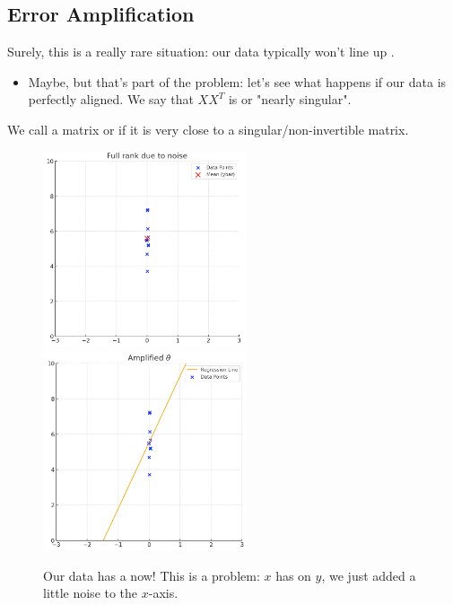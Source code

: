         \pagebreak

    \subsection{Error Amplification}

        Surely, this is a really rare situation: our data typically won't line up .

        \begin{itemize}
            \item Maybe, but that's part of the problem: let's see what happens if our data is  perfectly aligned. We say that $XX^T$ is  or "nearly singular".\\
        \end{itemize}

        \begin{definition}
            We call a matrix  or  if it is very close to a singular/non-invertible matrix.
        \end{definition}


        \begin{figure}[H]
        \centering
            \includegraphics[width=60mm,scale=0.5]{images/regression_images/noisy_full_rank.png}
            \includegraphics[width=60mm,scale=0.5]{images/regression_images/amplified_theta.png}
            \caption*{Our data has a  now! This is a problem: $x$ has  on $y$, we just added a little noise to the $x$-axis.}
        \end{figure}

